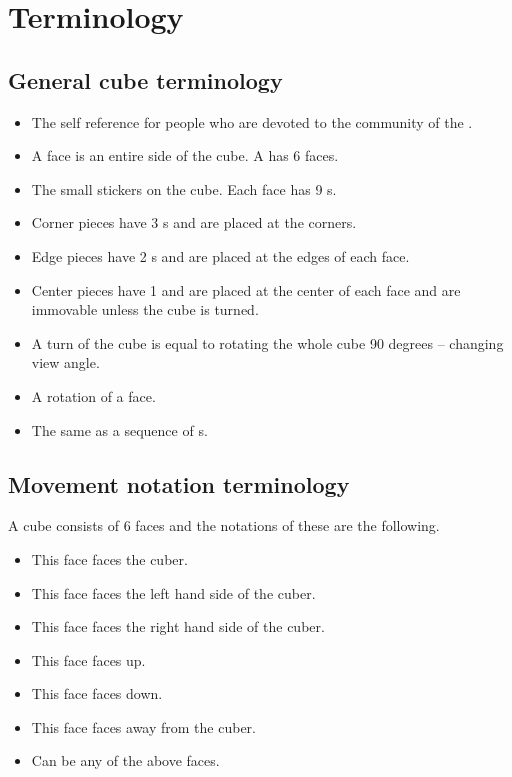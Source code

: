 \chapter{Terminology}
\section{General cube terminology}
\label{sec:generalNotation}
\begin{itemize}
\item {}The self reference for people who are devoted to the community of the \rubik{}. 
\item {}A face is an entire side of the cube. A \rubik{} has 6 faces.
\item {}The small stickers on the cube. Each face has 9 \facet{}s.
\item {}Corner pieces have 3 \facet{}s and are placed at the corners. 
\item {}Edge pieces have 2 \facet{}s and are placed at the edges of each face. 
\item {}Center pieces have 1 \facet{} and are placed at the center of each face and are immovable unless the cube is turned. 
\item {}A turn of the cube is equal to rotating the whole cube 90 degrees -- changing view angle.
\item {}A rotation of a face.%
\item {}  The same as a sequence of \twist{}s. 
\end{itemize}

\section{Movement notation terminology}
\label{sec:moveNotation}
A cube consists of 6 faces and the notations of these are the following.
\begin{itemize}
\item {}This face faces the cuber.
\item {}This face faces the left hand side of the cuber.
\item {}This face faces the right hand side of the cuber.
\item {}This face faces up.
\item {}This face faces down.
\item {}This face faces away from the cuber.
\item {}Can be any of the above faces.
\end{itemize} 

